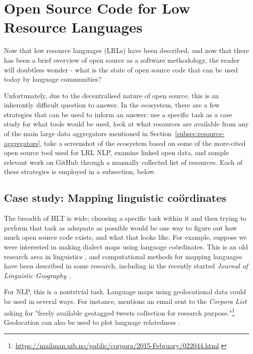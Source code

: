 \section{Open Source Code for Low Resource Languages}
\label{sec:endlangcode}

Now that low resource languages (LRLs) have been described, and now that there has been a brief overview of open source as a software methodology, the reader will doubtless wonder - what is the state of open source code that can be used today by language communities?

Unfortunately, due to the decentralised nature of open source, this is an inherently difficult question to answer. In the ecosystem, there are a few strategies that can be used to inform an answer: use a specific task as a case study for what tools would be used, look at what resources are available from any of the main large data aggregators mentioned in Section~\ref{subsec:resource-aggregators}, take a screenshot of the ecosystem based on some of the more-cited open source tool used for LRL NLP, examine linked open data, and sample relevant work on GitHub through a manually collected list of resources. Each of these strategies is employed in a subsection, below.

\subsection{Case study: Mapping linguistic co\"ordinates}

The breadth of HLT is wide; choosing a specific task within it and then trying to perform that task as adequate as possible would be one way to figure out how much open source code exists, and what that looks like. For example, suppose we were interested in making dialect maps using language co\"ordinates. This is an old research area in linguistics \citep{trudgill1983on,labov2005atlas}, and computational methods for mapping languages have been described in some research, including in the recently started {\it Journal of Linguistic Geography} \citep{labov2012journal}.

For NLP, this is a nontrivial task. Language maps using geolocational data could be used in several ways. For instance, \citep{mccrae2015reconciling} mentions an email sent to the {\it Corpora List} asking for "freely available geotagged tweets collection for research purpose."\footnote{\href{https://mailman.uib.no/public/corpora/2015-February/022044.html}{https://mailman.uib.no/public/corpora/2015-February/022044.html}. } Geolocation can also be used to plot language relatedness \citep{littauer2012visualizing}.


